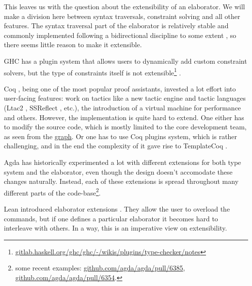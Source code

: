 \documentclass[
  sigconf,
  screen,
  review]{acmart}
\begin{document}
This leaves us with the question about the extensibility of an
elaborator. We will make a division here between syntax traversals,
constraint solving and all other features. The syntax traversal part of
the elaborator is relatively stable and commonly implemented following a
bidirectional discipline to some extent
\citep{norellPracticalProgrammingLanguage2007, tassiBiDirectionalRefinementAlgorithm2012, ferreiraBidirectionalElaborationDependently2014},
so there seems little reason to make it extensible.

GHC has a plugin system that allows users to dynamically add custom
constraint solvers, but the type of constraints itself is not
extensible\footnote{\href{https://gitlab.haskell.org/ghc/ghc/-/wikis/plugins/type-checker/notes}{gitlab.haskell.org/ghc/ghc/-/wikis/plugins/type-checker/notes}}
\citep{peytonjonesTypeInferenceConstraint2019, vytiniotisOutsideInModularType2011, peytonjonesPracticalTypeInference2007}.

Coq \citep{thecoqdevelopmentteamCoqProofAssistant2022}, being one of the
most popular proof assistants, invested a lot effort into user-facing
features: work on tactics like a new tactic engine
\citep{spiwackVerifiedComputingHomological2011} and tactic languages
(Ltac2 \citep{pedrotLtac2TacticalWarfare2019}, SSReflect
\citep{gonthierSmallScaleReflection2008}, etc.), the introduction of a
virtual machine for performance
\citep{gregoireCompiledImplementationStrong2002} and others. However,
the implementation is quite hard to extend. One either has to modify the
source code, which is mostly limited to the core development team, as
seen from the
\href{https://github.com/coq/coq/graphs/contributors}{graph}. Or one has
to use Coq plugins system, which is rather challenging, and in the end
the complexity of it gave rise to TemplateCoq
\citep{malechaExtensibleProofEngineering2014}.

Agda has historically experimented a lot with different extensions for
both type system and the elaborator, even though the design doesn't
accomodate these changes naturally. Instead, each of these extensions is
spread throughout many different parts of the code-base\footnote{some
  recent examples:
  \href{https://github.com/agda/agda/pull/6385}{github.com/agda/agda/pull/6385},
  \href{https://github.com/agda/agda/pull/6354}{github.com/agda/agda/pull/6354}.}.

Lean introduced elaborator extensions
\citep{leonardodemouraLeanMetaprogramming2021, ullrichNotationsHygienicMacro2020}.
They allow the user to overload the commands, but if one defines a
particular elaborator it becomes hard to interleave with others. In a
way, this is an imperative view on extensibility.
\end{document}
